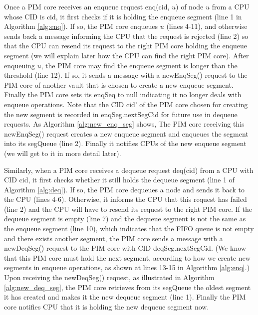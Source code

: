 Once a PIM core receives an enqueue request enq(cid, $u$) of node $u$ from a CPU whose CID is cid,
it first checks if it is holding the enqueue segment (line 1 in Algorithm \ref{alg:enq}).
If so, the PIM core enqueues $u$ (lines 4-11), and otherwise sends back a message
informing the CPU that the request is rejected (line 2) so that
the CPU can resend its request to the right PIM core holding the enqueue segment
(we will explain later how the CPU can find the right PIM core).
After enqueuing $u$, the PIM core may find the enqueue segment is longer than the threshold (line 12).
If so, it sends a message with a newEnqSeg() request to the PIM core of another vault that is chosen 
to create a new enqueue segment.
Finally the PIM core sets its enqSeq to null indicating it no longer deals with enqueue operations.
Note that the CID cid' of the PIM core chosen for creating the new segment is recorded in 
enqSeg.nextSegCid for future use in dequeue requests.
As Algorithm \ref{alg:new_enq_seg} shows,
The PIM core receiving this newEnqSeg() request creates a new enqueue segment and enqueues 
the segment into its segQueue (line 2). 
Finally it notifies CPUs of the new enqueue segment (we will get to it in more detail later).

Similarly, when a PIM core receives a dequeue request deq(cid) from a CPU with CID cid,
it first checks whether it still holds the dequeue segment (line 1 of Algorithm \ref{alg:deq}).
If so, the PIM core dequeues a node and sends it back to the CPU (lines 4-6).
Otherwise, it informs the CPU that this request has failed (line 2) and
the CPU will have to resend its request to the right PIM core.
If the dequeue segment is empty (line 7) and the dequeue segment is not the same as 
the enqueue segment (line 10), which indicates that the FIFO queue is not empty 
and there exists another segment, the PIM core sends a message with a newDeqSeg() request 
to the PIM core with CID deqSeg.nextSegCid. 
(We know that this PIM core must hold the next segment, 
according to how we create new segments in enqueue operations, 
as shown at lines 13-15 in Algorithm \ref{alg:enq}.) 
Upon receiving the newDeqSeg() request, as illustrated in Algorithm \ref{alg:new_deq_seg}, 
the PIM core retrieves from its segQueue the oldest segment it has created and 
makes it the new dequeue segment (line 1). 
Finally the PIM core notifies CPU that it is holding the new dequeue segment now.

